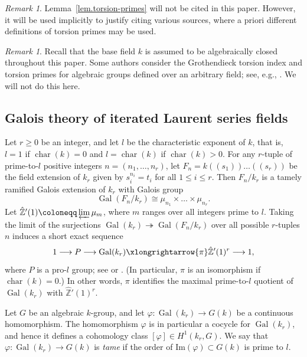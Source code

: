 \documentclass[12pt]{amsart}
\numberwithin{equation}{section}
\theoremstyle{remark}
\newtheorem{remark}[theorem]{Remark}
\newcommand{\vphi}{\varphi}
\newcommand{\Gal}{\operatorname{Gal}}
\newcommand{\Char}{\operatorname{char}}
\newcommand{\bZ}{\mathbb{Z}}
\begin{document}
\begin{remark} Lemma~\ref{lem.torsion-primes} will not be cited in this paper. However, it will be used implicitly to justify citing various sources, where a priori different definitions of torsion primes may be used.
\end{remark}

\begin{remark} Recall that the base field $k$ is assumed to be algebraically closed throughout this paper. Some authors consider the Grothendieck torsion index and torsion primes for algebraic groups defined over an arbitrary field;
see, e.g., \cite{tits1992, serre-pp}. We will not do this here.
\end{remark}

\subsection{Galois theory of iterated Laurent series fields}
\label{sect.galois-laurent}
Let $r\geqslant 0$ be an integer, and let $l$ be the characteristic exponent of $k$, that is, $l = 1$ if $\Char(k) = 0$ and $l = \Char(k)$ if $\Char(k) > 0$.
For any $r$-tuple of prime-to-$l$ positive integers $n = (n_1,\dots,n_r)$, let $F_n = k(\!(s_1)\!)\dots(\!(s_r)\!)$ be the field extension of $k_r$ given by $s_i^{n_i} = t_i$ for all $1\leq i\leq r$. Then $F_n/k_r$ is a tamely ramified Galois extension of $k_r$ with Galois group $$\Gal(F_n/k_r)\cong \mu_{n_1}\times \dots \times \mu_{n_r}.$$
Let $\hat{\bZ}'(1)\coloneqq \varprojlim \mu_m$, where $m$ ranges over all integers prime to $l$. Taking the limit of the surjections $\Gal(k_r) \twoheadrightarrow \Gal(F_n/k_r)$ over all possible $r$-tuples $n$ induces a short exact sequence
\begin{equation}\label{eq:gal-kr-presentation}
    1 \longrightarrow P \longrightarrow \Gal(k_r) \xlongrightarrow{\pi} \hat{\bZ}'(1)^r \longrightarrow 1,
\end{equation}
where $P$ is a pro-$l$ group; see \cite[Theorem A.24]{tignol2015value} or \cite[Lemma 5.1]{gille2009lower}. (In particular, $\pi$ is an isomorphism if $\Char(k)=0$.) In other words, $\pi$ identifies the maximal prime-to-$l$ quotient of $\Gal(k_r)$ with $\hat{\bZ}'(1)^r$.

Let $G$ be an algebraic $k$-group, and let $\vphi\colon \Gal(k_r)\to G(k)$ be a continuous homomorphism. The homomorphism $\vphi$ is in particular a cocycle for $\Gal(k_r)$, and hence it defines a cohomology class $[\vphi]\in H^1(k_r,G)$. We say that $\vphi\colon \Gal(k_r)\to G(k)$ is \emph{tame} if the order of $\mathrm{Im}(\vphi)\subset G(k)$ is prime to $l$.
\end{document}
